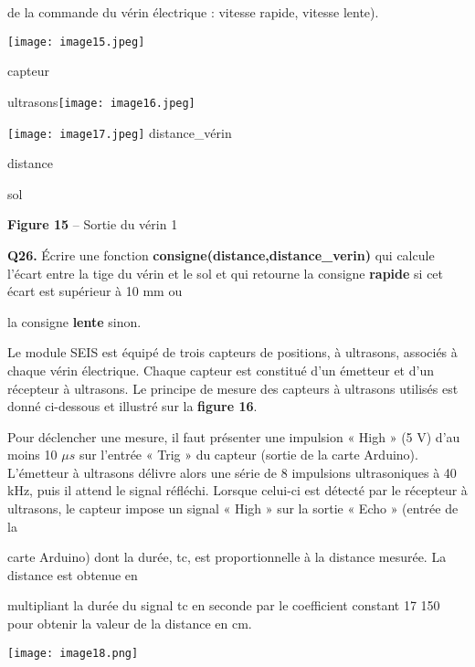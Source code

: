 de la commande du vérin électrique : vitesse rapide, vitesse lente).

\texttt{[image: image15.jpeg]}

capteur

ultrasons\texttt{[image: image16.jpeg]}

\texttt{[image: image17.jpeg]}
distance\_vérin

distance

sol

\textbf{Figure 15} -- Sortie du vérin 1

\textbf{Q26.} Écrire une fonction
\textbf{consigne(distance,distance\_verin)} qui calcule l'écart entre la
tige du vérin et le sol et qui retourne la consigne \textbf{rapide} si
cet écart est supérieur à 10 mm ou

la consigne \textbf{lente} sinon.

Le module SEIS est équipé de trois
capteurs de positions, à ultrasons, associés à chaque vérin électrique.
Chaque capteur est constitué d'un émetteur et d'un récepteur à
ultrasons. Le principe de mesure des capteurs à ultrasons utilisés est
donné ci-dessous et illustré sur la \textbf{figure 16}.

Pour déclencher une mesure, il faut présenter une impulsion « High » (5
V) d'au moins 10 $\mu s$ sur l'entrée « Trig » du capteur (sortie de la carte
Arduino). L'émetteur à ultrasons délivre alors une série de 8 impulsions
ultrasoniques à 40 kHz, puis il attend le signal réfléchi. Lorsque
celui-ci est détecté par le récepteur à ultrasons, le capteur impose un
signal « High » sur la sortie « Echo » (entrée de la

carte Arduino) dont la durée, tc, est proportionnelle à la distance
mesurée. La distance est obtenue en

multipliant la durée du signal tc en seconde par le coefficient constant
17 150 pour obtenir la valeur de la distance en cm.

\texttt{[image: image18.png]}
